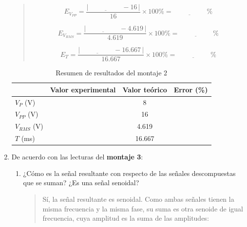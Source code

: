 \documentclass{article}
\newcommand{\vacio}[1][2cm]{\underline{\hspace{#1}}}
\begin{document}
\begin{enumerate}
\begin{quote}
            \[
                E_{V_{PP}} = \frac{\left|\,\vacio - 16\,\right|}{16} \times 100\% = \vacio\,\%
            \]

            \[
                E_{V_{RMS}} = \frac{\left|\,\vacio - 4.619\,\right|}{4.619} \times 100\% = \vacio\,\%
            \]

            \[
                E_{T} = \frac{\left|\,\vacio - 16.667\,\right|}{16.667} \times 100\% = \vacio\,\%
            \]
        \end{quote}

        \begin{table}[ht!]
            \centering
            \begin{tabular}{lccc}
                \toprule
                                & Valor experimental & Valor teórico & Error (\%)    \\
                \midrule
                $V_P$ (V)       & \vacio[1.8cm]      & 8             & \vacio[1.5cm] \\
                $V_{PP}$ (V)    & \vacio[1.8cm]      & 16            & \vacio[1.5cm] \\
                $V_{RMS}$ (V)   & \vacio[1.8cm]      & 4.619         & \vacio[1.5cm] \\
                $T$ (ms)        & \vacio[1.8cm]      & 16.667        & \vacio[1.5cm] \\
                \bottomrule
            \end{tabular}
            \caption{Resumen de resultados del montaje 2}\label{tab:res-m2}
        \end{table}

        \item De acuerdo con las lecturas del \textbf{montaje 3}:

        \begin{enumerate}[label=\alph*)] %
            \item ¿Cómo es la señal resultante con respecto de las señales descompuestas que se suman? ¿Es una señal senoidal?

            \begin{quote}
                Sí, la señal resultante es senoidal. Como ambas señales tienen la misma frecuencia y la misma fase, su suma es otra senoide de igual frecuencia, cuya amplitud es la suma de las amplitudes:


\end{quote}
\end{enumerate}
\end{enumerate}
\end{document}
